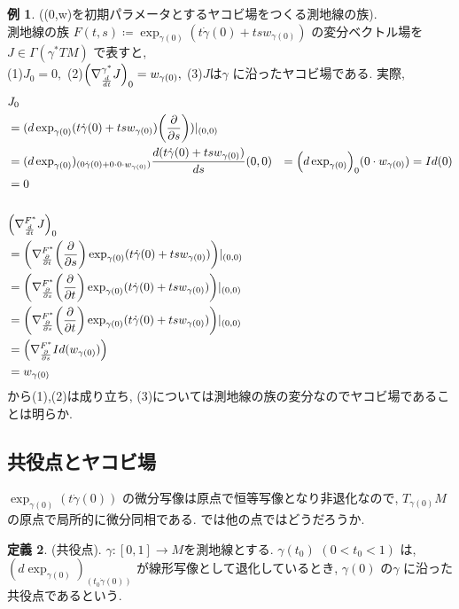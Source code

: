 \documentclass[twocolumn, landscape, a4paper , 8pt, fleqn, titlepage ]{jsarticle}
\theoremstyle{definition}
\newtheorem{dfn}{定義}[section]
\newtheorem{ex}[dfn]{例}
\newcommand{\paren}[1]{\mleft( #1\mright )}
\renewcommand{\-}{\hyphen}
\begin{document}
\begin{ex}((0,w)を初期パラメータとするヤコビ場をつくる測地線の族). \\
測地線の族 $F(t,s) \coloneqq \exp _{\gamma(0)} (t\dot \gamma(0) + ts w_{\gamma(0)} ) $ の変分ベクトル場を$J \in \Gamma(\gamma ^* TM)$ で表すと, \\
(1)$J_0 = 0,$ (2)$\paren{\nabla ^{\gamma ^* }_{\frac{d}{dt}} J }_0 = w_{\gamma(0)},$ (3)$J$は$\gamma$ に沿ったヤコビ場である. 
実際, 
\begin{align*}
&J_0 \\
&= (d\exp_{\gamma(0)}(t\dot \gamma(0) + tsw_{\gamma(0)}) \paren{\frac{\partial}{\partial s} })|_{(0,0)} \\
&= (d\exp_{\gamma(0)})_{(0\dot\gamma(0) + 0 \cdot 0 \cdot w_{\gamma(0)})} \frac{d(t\dot\gamma(0) + tsw_{\gamma(0)})}{ds} (0,0) 
&=   \paren{d \exp _{\gamma(0)}}_{0} (0\cdot w_{\gamma(0)}) = Id(0) \\
&= 0 \quad  \\
\\
&\paren{\nabla^{F^*}_{\frac{d}{d t}} J }_0 \\
&= \paren{\nabla^{F^*}_{\frac{\partial}{\partial t}} \paren{\frac{\partial}{\partial s}} \exp _{\gamma(0)} (t\dot \gamma(0) + tsw_{\gamma(0)}) }|_{(0,0)} \\
&= \paren{\nabla^{F^*}_{\frac{\partial}{\partial s}} \paren{\frac{\partial}{\partial t}} \exp _{\gamma(0)} (t\dot \gamma(0) + tsw_{\gamma(0)}) }|_{(0,0)} \\
&= \paren{\nabla^{F^*}_{\frac{\partial}{\partial s}} \paren{\frac{\partial}{\partial t}} \exp _{\gamma(0)} (t\dot \gamma(0) + tsw_{\gamma(0)}) }|_{(0,0)} \\
&= \paren{\nabla^{F^*}_{\frac{\partial}{\partial s}} Id (w_{\gamma (0)})  } \\
& = w_{\gamma(0)}
\end{align*}
から(1),(2)は成り立ち, (3)については測地線の族の変分なのでヤコビ場であることは明らか.
\end{ex}



\subsection{共役点とヤコビ場}
$\exp_{\gamma(0)}(t\dot \gamma(0))$ の微分写像は原点で恒等写像となり非退化なので, $T_{\gamma(0)} M$ の原点で局所的に微分同相である. では他の点ではどうだろうか. \\

\begin{dfn}(共役点).
$\gamma : [0,1] \rightarrow M$を測地線とする. $\gamma(t_0)\,\, (0 < t_0 < 1)$ は, $(d\exp_{\gamma(0)})_{(t_0 \dot \gamma (0))} $ が線形写像として退化しているとき, $\gamma(0)$ の$\gamma$ に沿った共役点であるという. 
\end{dfn}
\end{document}

